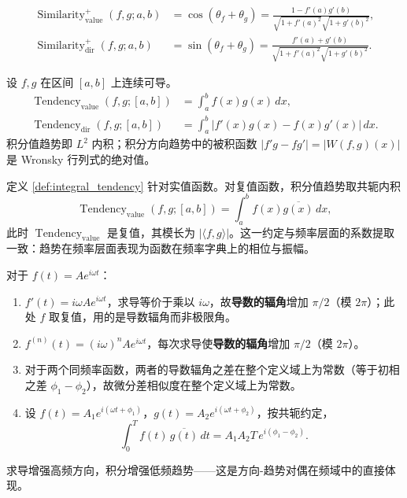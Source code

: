 \begin{definition}[微分和相似度]\label{def:diff_sum_similarity}
\begin{align*}
\operatorname{Similarity}_{\text{value}}^+(f, g; a, b) &= \cos(\theta_f + \theta_g) = \frac{1 - f'(a)g'(b)}{\sqrt{1 + f'(a)^2} \sqrt{1 + g'(b)^2}}, \\
\operatorname{Similarity}_{\text{dir}}^+(f, g; a, b) &= \sin(\theta_f + \theta_g) = \frac{f'(a) + g'(b)}{\sqrt{1 + f'(a)^2} \sqrt{1 + g'(b)^2}}.
\end{align*}
\end{definition}

\begin{definition}[积分趋势]\label{def:integral_tendency}
设 $f, g$ 在区间 $[a, b]$ 上连续可导。
\begin{align*}
\operatorname{Tendency}_{\text{value}}(f, g; [a,b]) &= \int_a^b f(x)g(x)\,dx, \\
\operatorname{Tendency}_{\text{dir}}(f, g; [a,b]) &= \int_a^b |f'(x) g(x) - f(x) g'(x)|\,dx.
\end{align*}
积分值趋势即 $L^2$ 内积；积分方向趋势中的被积函数 $|f'g - fg'| = |W(f,g)(x)|$ 是 Wronsky 行列式的绝对值。
\end{definition}

\begin{remark}[复值函数的共轭约定]\label{rem:complex_tendency_conjugate}
定义 \ref{def:integral_tendency} 针对实值函数。对复值函数，积分值趋势取共轭内积
\[
\operatorname{Tendency}_{\text{value}}(f, g; [a,b]) = \int_a^b f(x)\overline{g(x)}\,dx,
\]
此时 $\operatorname{Tendency}_{\text{value}}$ 是复值，其模长为 $|\langle f, g\rangle|$。这一约定与频率层面的系数提取一致：趋势在频率层面表现为函数在频率字典上的相位与振幅。
\end{remark}

\begin{example}[简谐周期函数的极限角与相似度]\label{ex:harmonic_similarity}
对于 $f(t) = A e^{i\omega t}$：
\begin{enumerate}[label=(\roman*)]
    \item $f'(t) = i\omega A e^{i\omega t}$，求导等价于乘以 $i\omega$，故\textbf{导数的辐角}增加 $\pi/2$（模 $2\pi$）；此处 $f$ 取复值，用的是导数辐角而非极限角。
    \item $f^{(n)}(t) = (i\omega)^n A e^{i\omega t}$，每次求导使\textbf{导数的辐角}增加 $\pi/2$（模 $2\pi$）。
    \item 对于两个同频率函数，两者的导数辐角之差在整个定义域上为常数（等于初相之差 $\phi_1 - \phi_2$），故微分差相似度在整个定义域上为常数。
    \item 设 $f(t) = A_1 e^{i(\omega t + \phi_1)}$，$g(t) = A_2 e^{i(\omega t + \phi_2)}$，按共轭约定，
    \[
    \int_0^T f(t)\,\overline{g(t)}\,dt = A_1 A_2 T\, e^{i(\phi_1 - \phi_2)}.
    \]
\end{enumerate}
求导增强高频方向，积分增强低频趋势——这是方向-趋势对偶在频域中的直接体现。
\end{example}

